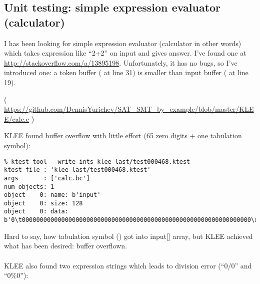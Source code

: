 \subsection{Unit testing: simple expression evaluator (calculator)}

I has been looking for simple expression evaluator (calculator in other words) which takes expression like ``2+2'' on input and gives answer.
I've found one at \url{http://stackoverflow.com/a/13895198}.
Unfortunately, it has no bugs, so I've introduced one: a token buffer ( at line 31) is smaller than input buffer ( at line 19).


( \url{https://github.com/DennisYurichev/SAT_SMT_by_example/blob/master/KLEE/calc.c} )

KLEE found buffer overflow with little effort (65 zero digits + one tabulation symbol):

\begin{lstlisting}
% ktest-tool --write-ints klee-last/test000468.ktest
ktest file : 'klee-last/test000468.ktest'
args       : ['calc.bc']
num objects: 1
object    0: name: b'input'
object    0: size: 128
object    0: data: b'0\t0000000000000000000000000000000000000000000000000000000000000000\xff\xff\xff\xff\xff\xff\xff\xff\xff\xff\xff\xff\xff\xff\xff\xff\xff\xff\xff\xff\xff\xff\xff\xff\xff\xff\xff\xff\xff\xff\xff\xff\xff\xff\xff\xff\xff\xff\xff\xff\xff\xff\xff\xff\xff\xff\xff\xff\xff\xff\xff\xff\xff\xff\xff\xff\xff\xff\xff\xff\xff\xff'
\end{lstlisting}

Hard to say, how tabulation symbol () got into input[] array, but KLEE achieved what has been desired: buffer overflown.\\
\\
KLEE also found two expression strings which leads to division error (``0/0'' and ``0\%0''):

